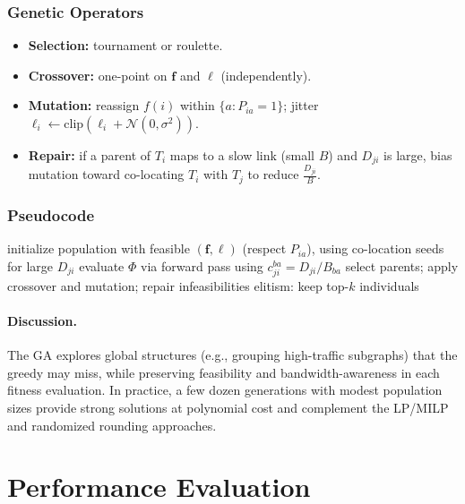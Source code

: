 \documentclass[conference]{IEEEtran}
\begin{document}
\subsubsection{Genetic Operators}
\begin{itemize}
    \item \textbf{Selection:} tournament or roulette.
    \item \textbf{Crossover:} one-point on \(\mathbf{f}\) and \(\boldsymbol{\ell}\) (independently).
    \item \textbf{Mutation:} reassign \(f(i)\) within \(\{a:P_{ia}=1\}\); jitter \(\ell_i\leftarrow\text{clip}(\ell_i+\mathcal{N}(0,\sigma^2))\).
    \item \textbf{Repair:} if a parent of \(T_i\) maps to a slow link (small \(B\)) and \(D_{ji}\) is large, bias mutation toward co-locating \(T_i\) with \(T_j\) to reduce \(\tfrac{D_{ji}}{B}\).
\end{itemize}

\subsubsection{Pseudocode}
\begin{algorithm}[t]
\caption{Genetic Algorithm for Bandwidth/Data-Aware Fog Scheduling}
\label{alg:genetic}
\begin{algorithmic}[1]
\STATE initialize population with feasible \((\mathbf{f},\boldsymbol{\ell})\) (respect \(P_{ia}\)), using co-location seeds for large \(D_{ji}\)
\REPEAT
    \STATE evaluate $\Phi$ via forward pass using $c_{ji}^{ba}=D_{ji}/B_{ba}$
    \STATE select parents; apply crossover and mutation; repair infeasibilities
    \STATE elitism: keep top-$k$ individuals
\end{algorithmic}
\end{algorithm}

\paragraph{Discussion.} The GA explores global structures (e.g., grouping high-traffic subgraphs) that the greedy may miss, while preserving feasibility and bandwidth-awareness in each fitness evaluation. In practice, a few dozen generations with modest population sizes provide strong solutions at polynomial cost and complement the LP/MILP and randomized rounding approaches.

\section{Performance Evaluation} 
\label{performance_analysis}
\end{document}
